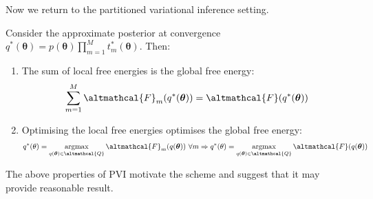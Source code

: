 Now we return to the partitioned variational inference setting.
\begin{theorem}
	Consider the approximate posterior at convergence $q^*(\bm{\theta}) = p(\bm{\theta}) \prod_{m=1}^M t_m^{*}(\bm{\theta})$. Then:
	\begin{enumerate}
		\item The sum of local free energies is the global free energy:
		\begin{align}
		\sum_{m=1}^M \altmathcal{F}_m(q^*(\bm{\theta})) = \altmathcal{F}(q^*(\bm{\theta}))
		\end{align}
		\item Optimising the local free energies optimises the global free energy:
		\begin{align}
		q^*(\theta) = \mathop{\mathrm{argmax}}_{q(\bm{\theta}) \in \altmathcal{Q}} \altmathcal{F}_m(q(\bm{\theta}))\ \forall m \Rightarrow q^*(\theta) = \mathop{\mathrm{argmax}}_{q(\bm{\theta}) \in \altmathcal{Q}} \altmathcal{F}(q(\bm{\theta}))
		\end{align}
	\end{enumerate}
\end{theorem}

The above properties of PVI motivate the scheme and suggest that it may provide reasonable result. \cite{PVI} 